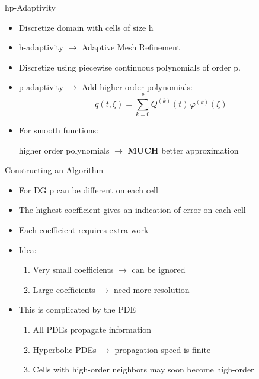 \documentclass[sansserif]{beamer}
\begin{document}
\begin{frame}{hp-Adaptivity}
 \begin{itemize}
  \item Discretize domain with cells of size h
  \item h-adaptivity $\rightarrow$ Adaptive Mesh Refinement
  \item Discretize using piecewise continuous polynomials of order p.
  \item p-adaptivity $\rightarrow$ Add higher order polynomials:
  \[ q(t,\xi) = \sum_{k=0}^p Q^{(k)}(t) \, \varphi^{(k)}(\xi) \]
  \item {\color{red} For smooth functions:
  
  higher order polynomials $\rightarrow$ {\bf MUCH} better approximation}
 \end{itemize}
\end{frame}

\begin{frame}{Constructing an Algorithm}
\begin{itemize}
   \item For DG p can be different on each cell
  \item The highest coefficient gives an indication of error on each cell
    \item Each coefficient requires extra work
    \item {\color{red} Idea:}
    \begin{enumerate}
  \item Very small coefficients $\rightarrow$ can be ignored
  \item Large coefficients $\rightarrow$ need more resolution
  \end{enumerate}
  \item This is complicated by the PDE
  \begin{enumerate}
   \item All PDEs propagate information
   \item Hyperbolic PDEs $\rightarrow$ propagation speed is finite
   \item Cells with high-order neighbors may soon become high-order
  \end{enumerate}
\end{itemize}
\end{frame}
\end{document}
